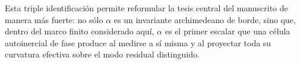 Esta triple identificación permite reformular la tesis central del manuscrito de manera más fuerte:
no sólo $\alpha$ es un invariante archimedeano de borde, sino que, dentro del marco finito
considerado aquí, $\alpha$ es el primer escalar que una célula autoinercial de fase produce al
medirse a sí misma y al proyectar toda su curvatura efectiva sobre el modo residual distinguido.
